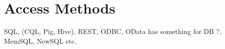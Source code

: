 \section{Access Methods}
SQL, (CQL, Pig, Hive), REST, ODBC, OData has something for DB ?, MemSQL, NewSQL etc.